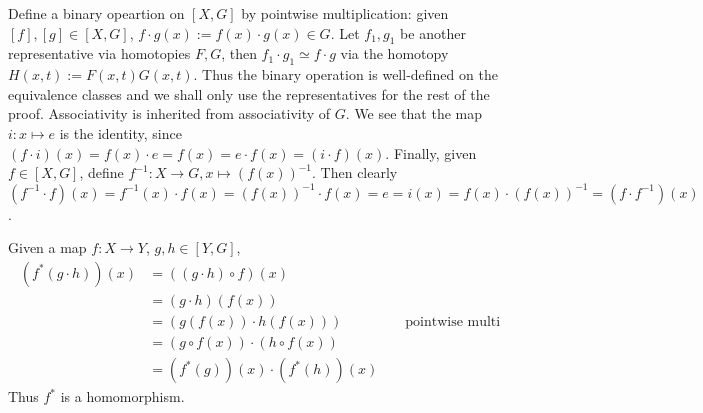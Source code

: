 \documentclass[12pt]{article}
\begin{document}
\begin{problem}[8]
	Define a binary opeartion on $ [X,G]$ by pointwise multiplication: given $ [f],[g] \in [X,G]$, $ f \cdot g (x):= f(x) \cdot g(x) \in G$. Let $ f_1,g_1$ be another representative via homotopies $ F,G$, then $ f_1 \cdot g_1 \simeq f \cdot g$ via the homotopy $ H(x,t):= F(x,t)G(x,t)$. Thus the binary operation is well-defined on the equivalence classes and we shall only use the representatives for the rest of the proof. Associativity is inherited from associativity of $ G$. We see that the map $ i: x \mapsto e$ is the identity, since $ (f \cdot i)(x) = f(x) \cdot e = f(x) = e \cdot f(x) = (i \cdot f)(x) $. Finally, given $ f\in [X,G]$, define $ f^{-1}: X \to G, x \mapsto (f(x))^{-1}$. Then clearly $ (f^{-1} \cdot f)(x) = f^{-1}(x) \cdot f(x) = (f(x))^{-1} \cdot f(x) = e = i(x) = f(x) \cdot (f(x))^{-1} = (f \cdot f^{-1})(x)$.

	Given a map $ f: X \to Y$, $ g,h \in [Y,G]$,
\begin{align*}
	(f^* (g \cdot h))(x) &= ((g \cdot h) \circ f)(x) \\
	&= (g \cdot h) (f(x)) \\
	&= (g(f(x)) \cdot h(f(x))) && \text{ pointwise multi} \\
	&= (g \circ f(x)) \cdot (h \circ f(x)) \\
	&= (f^* (g)) (x) \cdot (f^* (h))(x) 
\end{align*}
Thus $ f^* $ is a homomorphism.
\end{problem}
\end{document}
